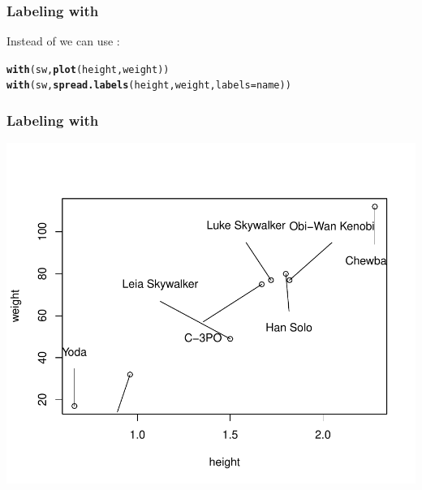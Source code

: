 \documentclass[12pt]{beamer}\usepackage[]{graphicx}\usepackage[]{color}
\makeatletter
\newcommand{\hlstd}[1]{\textcolor[rgb]{0.345,0.345,0.345}{#1}}%
\newcommand{\hlkwc}[1]{\textcolor[rgb]{0.333,0.667,0.333}{#1}}%
\newcommand{\hlkwd}[1]{\textcolor[rgb]{0.737,0.353,0.396}{\textbf{#1}}}%
\newenvironment{kframe}{%
 \def\at@end@of@kframe{}%
 \ifinner\ifhmode%
  \def\at@end@of@kframe{\end{minipage}}%
  \begin{minipage}{\columnwidth}%
 \fi\fi%
 \def\FrameCommand##1{\hskip\@totalleftmargin \hskip-\fboxsep
 \colorbox{shadecolor}{##1}\hskip-\fboxsep
     \hskip-\linewidth \hskip-\@totalleftmargin \hskip\columnwidth}%
 \MakeFramed {\advance\hsize-\width
   \@totalleftmargin\z@ \linewidth\hsize
   \@setminipage}}%
 {\par\unskip\endMakeFramed%
 \at@end@of@kframe}
\newenvironment{knitrout}{}{} %
\makeatother
\begin{document}

\begin{frame}[fragile]
\frametitle{Labeling with }

Instead of  we can use {\hilit {}}:
\begin{knitrout}\footnotesize
{}\color{fgcolor}\begin{kframe}
\begin{alltt}
\hlkwd{with}\hlstd{(sw,} \hlkwd{plot}\hlstd{(height, weight))}
\hlkwd{with}\hlstd{(sw,} \hlkwd{spread.labels}\hlstd{(height, weight,} \hlkwc{labels} \hlstd{= name))}
\end{alltt}
\end{kframe}
\end{knitrout}

\end{frame}


\begin{frame}[fragile]
\frametitle{Labeling with }

\begin{knitrout}\footnotesize
{}\color{fgcolor}

{\centering \includegraphics[width=.8\linewidth,height=.7\linewidth]{figure/sw_plot3-1} 

}



\end{knitrout}

\end{frame}
\end{document}
